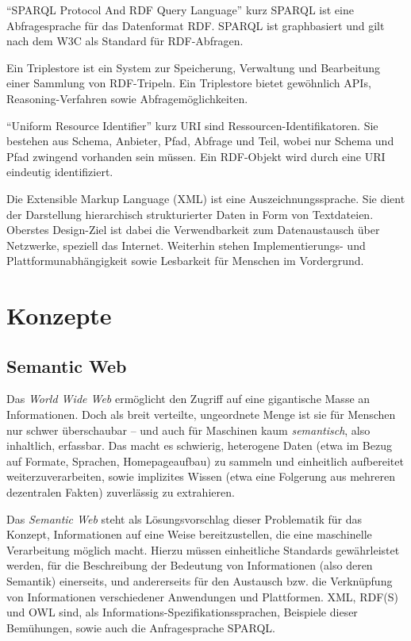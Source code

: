 {“SPARQL Protocol And RDF Query Language” kurz SPARQL ist eine Abfragesprache für das Datenformat RDF. SPARQL ist graphbasiert und gilt nach dem W3C als Standard für RDF-Abfragen. \cite{w3c-rdf-sparql-query,sparql-wiki}}

{Ein Triplestore ist ein System zur Speicherung, Verwaltung und Bearbeitung einer
 Sammlung von RDF-Tripeln. Ein Triplestore bietet gewöhnlich APIs,
 Rea\-so\-ning-Verfahren sowie Abfragemöglichkeiten. \cite{fraunhofer}}

{“Uniform Resource Identifier” kurz URI sind Ressourcen-Identifikatoren. Sie bestehen 
aus Schema, Anbieter, Pfad, Abfrage und Teil, wobei nur Schema und Pfad zwingend 
vorhanden sein müssen. Ein RDF-Objekt wird durch eine URI eindeutig identifiziert. \cite{uri}}

{Die Extensible Markup Language (XML) ist eine Auszeichnungssprache. Sie dient der Darstellung hierarchisch strukturierter Daten in Form von Textdateien. Oberstes Design-Ziel ist dabei die Verwendbarkeit zum Datenaustausch über Netzwerke, speziell das Internet. Weiterhin stehen Implementierungs- und Plattformunabhängigkeit sowie Lesbarkeit für Menschen im Vordergrund.
\cite{xml}
}




\section{Konzepte}

\subsection{Semantic Web}

Das \emph{World Wide Web} ermöglicht den Zugriff auf eine gigantische Masse an Informationen. Doch als breit verteilte, ungeordnete Menge ist sie für Menschen nur schwer überschaubar – und auch für Maschinen kaum \emph{semantisch}, also inhaltlich, erfassbar. Das macht es schwierig, heterogene Daten (etwa im Bezug auf Formate, Sprachen, Homepageaufbau) zu sammeln und einheitlich aufbereitet weiterzuverarbeiten, sowie implizites Wissen (etwa eine Folgerung aus mehreren dezentralen Fakten) zuverlässig zu extrahieren.

Das \emph{Semantic Web} steht als Lösungsvorschlag dieser Problematik für das Konzept, Informationen auf eine Weise bereitzustellen, die eine maschinelle Verarbeitung möglich macht. Hierzu müssen einheitliche Standards gewährleistet werden, für die Beschreibung der Bedeutung von Informationen (also deren Semantik) einerseits, und andererseits für den Austausch bzw. die Verknüpfung von Informationen verschiedener Anwendungen und Plattformen. XML, RDF(S) und OWL sind, als Informations-Spezifikationssprachen, Beispiele dieser Bemühungen, sowie auch die Anfragesprache SPARQL. \cite{hitzler}

